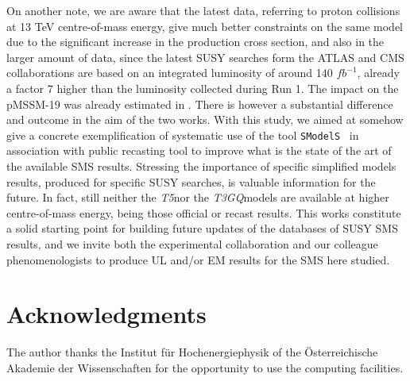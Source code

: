 \documentclass[preprint,number,sort&compress,twocolumn,3p]{elsstyarticle}
\newcommand{\SMO}{\texttt{SModelS\xspace}}
\newcommand{\TGQ}{ \textit{T3GQ}}
\newcommand{\Tfive}{ \textit{T5}}
\newcommand{\ONE}{\onecolumn}
\begin{document}
On another note, we are aware that the latest data, referring to proton collisions at 13 TeV centre-of-mass energy, give much better constraints on the same model due to the significant increase in the production cross section, and also in the larger amount of data, since the latest SUSY searches form the ATLAS and CMS collaborations are based on an integrated luminosity of around 140 $fb^{-1}$, already a factor 7 higher than the luminosity collected during Run 1. The impact on the pMSSM-19 was already estimated in \cite{Dutta:2018ioj}. There is however a substantial difference and outcome in the aim of the two works. With this study, we aimed at somehow give a concrete exemplification of systematic use of the tool \SMO~ in association with public recasting tool to improve what is the state of the art of the available SMS results. Stressing the importance of specific simplified models results, produced for specific SUSY searches, is valuable information for the future. In fact, still neither the \Tfive nor the \TGQ models are available at higher centre-of-mass energy, being those official or recast results. This works constitute a solid starting point for building future updates of the databases of SUSY SMS results, and we invite both the experimental collaboration and our colleague phenomenologists to produce UL and/or EM results for the SMS here studied.
%
\section*{Acknowledgments}
The author thanks the Institut f\"ur Hochenergiephysik of the \"Osterreichische Akademie der Wissenschaften for the opportunity to use the computing facilities.
%


\appendix
\ONE
%
\end{document}
